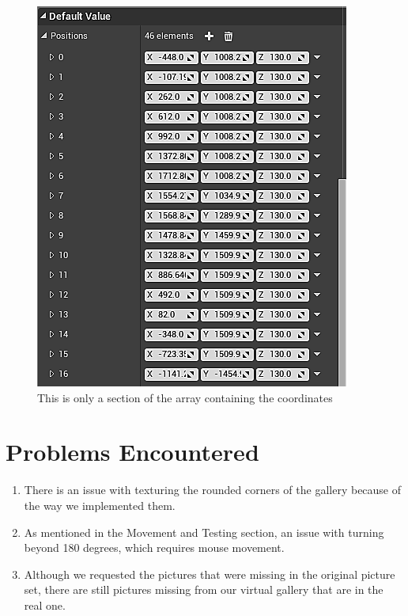\documentclass[11pt]{book}
\begin{document}
\begin{figure}
\caption{This is only a section of the array containing the coordinates}
\centering
\includegraphics[scale=1.0]{Waypoint.png}
\end{figure}


\section*{Problems Encountered}
\begin{enumerate}
\item There is an issue with texturing the rounded corners of the gallery because of the way we implemented them.

\item As mentioned in the Movement and Testing section, an issue with turning beyond 180 degrees, which requires mouse movement.  

\item Although we requested the pictures that were missing in the original picture set, there are still pictures missing from our virtual gallery that are in the real one.
\end{enumerate}
\end{document}
